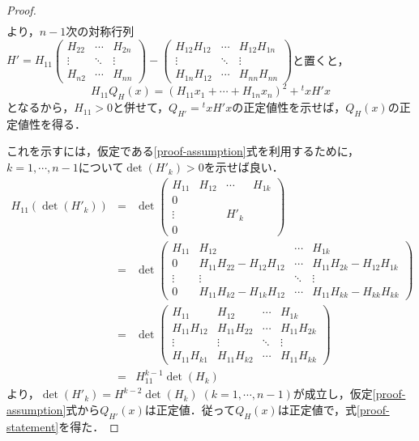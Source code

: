 \documentclass[uplatex, dvipdfmx]{jsreport}
\begin{document}
\begin{proof}
\begin{eqnarray*}
    \end{eqnarray*}
    より，$n-1$次の対称行列$H'=H_{11}\left(\begin{array}{lcr}H_{22} &\cdots &H_{2n} \\ \vdots & \ddots &\vdots \\ H_{n2}&\cdots&H_{nn}\end{array}\right)-\left(\begin{array}{lcr}H_{12}H_{12} &\cdots &H_{12}H_{1n} \\ \vdots & \ddots &\vdots \\ H_{1n}H_{12}&\cdots&H_{nn}H_{nn}\end{array}\right)$と置くと，
    \[H_{11}Q_H(x)=(H_{11}x_1+\cdots+H_{1n}x_n)^2+{}^txH'x\]
    となるから，$H_{11}>0$と併せて，$Q_{H'}={}^txH'x$の正定値性を示せば，$Q_H(x)$の正定値性を得る．
    
    これを示すには，仮定である\ref{proof-assumption}式を利用するために，$k=1,\cdots,n-1$について$\det({H'}_k)>0$を示せば良い．
    \begin{eqnarray*}
        H_{11}(\det({H'}_k)) &=& \det \left(\begin{array}{lccr}H_{11} &H_{12} &\cdots &H_{1k} \\ 0 &  & & \\ \vdots & & {H'}_k & \\ 0& & & \end{array}\right) \\
        &=& \det \left(\begin{array}{lccr}H_{11} &H_{12} &\cdots &H_{1k} \\ 0 & H_{11}H_{22}-H_{12}H_{12} & \cdots & H_{11}H_{2k}-H_{12}H_{1k} \\ \vdots & \vdots & \ddots & \vdots \\ 0& H_{11}H_{k2}-H_{1k}H_{12} & \cdots &H_{11}H_{kk}-H_{kk}H_{kk} \end{array}\right) \\
        &=& \det \left(\begin{array}{lccr}H_{11} &H_{12} &\cdots &H_{1k} \\ H_{11}H_{12} & H_{11}H_{22} & \cdots & H_{11}H_{2k} \\ \vdots & \vdots & \ddots & \vdots \\ H_{11}H_{k1}& H_{11}H_{k2} & \cdots &H_{11}H_{kk} \end{array}\right) \\
        &=& H_{11}^{k-1}\det(H_k)
    \end{eqnarray*}
    より，$\det({H'}_k)=H^{k-2}\det(H_k)\;(k=1,\cdots,n-1)$が成立し，仮定\ref{proof-assumption}式から$Q_{H'}(x)$は正定値．従って$Q_H(x)$は正定値で，式\ref{proof-statement}を得た．
\end{proof}
\end{document}
